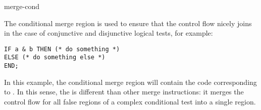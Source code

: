 \begin{instruction}{merge-cond}

  \begin{notes}
    The conditional merge region is used to ensure that the control
    flow nicely joins in the case of conjunctive and disjunctive
    logical tests, for example:

\begin{verbatim}
IF a & b THEN (* do something *)
ELSE (* do something else *)
END;
\end{verbatim}

    In this example, the conditional merge region will contain the
    code corresponding to .  In this
    sense, the  is different than other merge
    instructions: it merges the control flow for all false regions of
    a complex conditional test into a single region.
  \end{notes}

  \nresults

  \begin{operands}
  \item {}
  \item {}
  \end{operands}

  \begin{seealso}
  \end{seealso}
\end{instruction}

